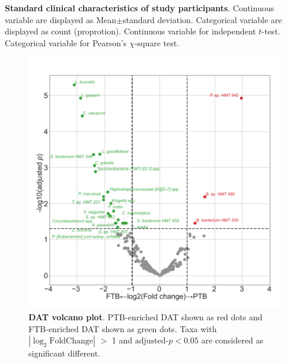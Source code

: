 \documentclass[11pt, a4paper, onecolumn, oneside]{report}
\begin{document}
            \begin{table}[p]
                \centering

                \caption[Standard clinical characteristics of study participants]{\textbf{Standard clinical characteristics of study participants}. Continuous variable are displayed as Mean$\pm$standard deviation. Categorical variable are displayed as count (proprotion). Continuous variable for independent $t$-test. Categorical variable for Pearson’s $\chi$-square test.}
                \label{tab:PTB-clinical}
            \end{table}
            \clearpage

            \begin{figure}[p]
                \centering
                \includegraphics[width=12 cm]{Figures/PTB/Fig1-DAT.pdf}
                \caption[DAT volcano plot]{\textbf{DAT volcano plot}. PTB-enriched DAT shown as red dots and FTB-enriched DAT shown as green dots. Taxa with $| \log _2 \textrm{FoldChange} |$ $>$ 1 and $\textrm{adjusted-} p < 0.05$ are considered as significant different.}
                \label{fig:PTB-DAT}
            \end{figure}
            \clearpage
\end{document}

